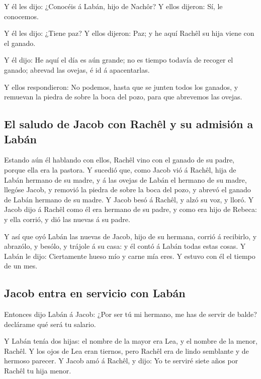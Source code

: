  Y él les dijo: ¿Conocéis á Labán, hijo de Nachôr? Y ellos
dijeron: Sí, le conocemos.

 Y él les dijo: ¿Tiene paz? Y ellos dijeron: Paz; y he aquí
Rachêl su hija viene con el ganado.

 Y él dijo: He aquí el día es aún grande; no es tiempo
todavía de recoger el ganado; abrevad las ovejas, é id á apacentarlas.

 Y ellos respondieron: No podemos, hasta que se junten todos
los ganados, y remuevan la piedra de sobre la boca del pozo, para que
abrevemos las ovejas.

\hypertarget{el-saludo-de-jacob-con-rachuxeal-y-su-admisiuxf3n-a-labuxe1n}{%
\subsection{El saludo de Jacob con Rachêl y su admisión a
Labán}\label{el-saludo-de-jacob-con-rachuxeal-y-su-admisiuxf3n-a-labuxe1n}}

 Estando aún él hablando con ellos, Rachêl vino con el
ganado de su padre, porque ella era la pastora.  Y sucedió
que, como Jacob vió á Rachêl, hija de Labán hermano de su madre, y á las
ovejas de Labán el hermano de su madre, llegóse Jacob, y removió la
piedra de sobre la boca del pozo, y abrevó el ganado de Labán hermano de
su madre.  Y Jacob besó á Rachêl, y alzó su voz, y lloró.
 Y Jacob dijo á Rachêl como él era hermano de su padre, y
como era hijo de Rebeca: y ella corrió, y dió las nuevas á su padre.

 Y así que oyó Labán las nuevas de Jacob, hijo de su
hermana, corrió á recibirlo, y abrazólo, y besólo, y trájole á su casa:
y él contó á Labán todas estas cosas.  Y Labán le dijo:
Ciertamente hueso mío y carne mía eres. Y estuvo con él el tiempo de un
mes.

\hypertarget{jacob-entra-en-servicio-con-labuxe1n}{%
\subsection{Jacob entra en servicio con
Labán}\label{jacob-entra-en-servicio-con-labuxe1n}}

 Entonces dijo Labán á Jacob: ¿Por ser tú mi hermano, me
has de servir de balde? declárame qué será tu salario.

 Y Labán tenía dos hijas: el nombre de la mayor era Lea, y
el nombre de la menor, Rachêl.  Y los ojos de Lea eran
tiernos, pero Rachêl era de lindo semblante y de hermoso parecer.
 Y Jacob amó á Rachêl, y dijo: Yo te serviré siete años por
Rachêl tu hija menor.

